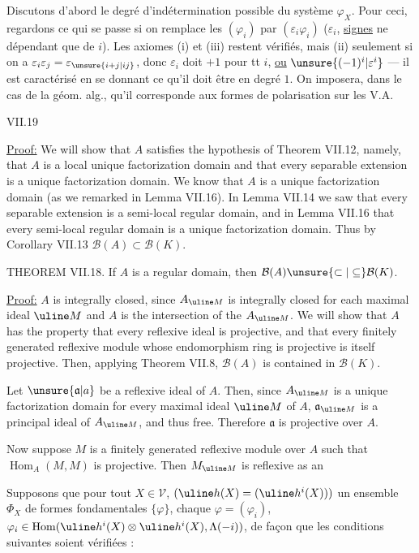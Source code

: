 Discutons d'abord le degré d'indétermination possible du système $\varphi_X$. Pour ceci,   regardons ce qui se passe si on remplace les $(\varphi_i)$ par $(\varepsilon_i\varphi_i)$ ($\varepsilon_i$, \uline{signes} ne dépendant que de $i$). Les axiomes (i) et (iii) restent vérifiés, mais (ii) seulement si on a $\varepsilon_i\varepsilon_j=\varepsilon_{\unsure{i+j|ij}}$, donc $\varepsilon_i$ doit  $+1$ pour tt $i$, \uline{ou} $\unsure{(-1)^i|\varepsilon^i}$ --- il est caractérisé en se donnant ce qu'il doit être en degré $1$.
On imposera, dans le cas de la géom. alg., qu'il corresponde aux formes de polarisation sur les V.A.


VII.19

\uline{Proof:} We will show that $A$ satisfies the hypothesis of
Theorem VII.12, namely, that $A$ is a local unique factorization
domain and that every separable extension is a unique factorization
domain. We know that $A$ is a unique factorization domain (as we
remarked in Lemma VII.16). In Lemma VII.14 we saw that every
separable extension is a semi-local regular domain, and in Lemma
VII.16 that every semi-local regular domain is a unique factorization
domain. Thus by Corollary VII.13 $\mathcal B(A)\subset\mathcal B(K)$.

THEOREM VII.18. If $A$ is a regular domain, then
$\mathcal B(A)\unsure{\subset|\subseteq}\mathcal B(K)$.

\uline{Proof:} $A$ is integrally closed, since $A_{\uline M}$ is integrally closed
for each maximal ideal $\uline M$ and $A$ is the intersection of the $A_{\uline M}$.
We will show that $A$ has the property that every reflexive ideal is
projective, and that every finitely generated reflexive module whose
endomorphism ring is projective is itself projective. Then, applying
Theorem VII.8, $\mathcal B(A)$ is contained in $\mathcal B(K)$.

Let $\unsure{\mathfrak a|a}$ be a reflexive ideal of $A$. Then, since $A_{\uline M}$ is a unique
factorization domain for every maximal ideal $\uline M$ of $A$, $\mathfrak a_{\uline M}$ is a
principal ideal of $A_{\uline M}$, and thus free. Therefore $\mathfrak a$ is projective
over $A$.

Now suppose $M$ is a finitely generated reflexive module over $A$
such that $\operatorname{Hom}_A(M,M)$ is projective. Then $M_{\uline M}$ is reflexive as an

Supposons que pour tout $X\in\mathcal V$, 
$(\uline h(X)=(\uline h^i(X)))$
un ensemble $\Phi_X$ de formes fondamentales
$\{\varphi\}$, chaque $\varphi=(\varphi_i)$,
$\varphi_i\in\operatorname{Hom}(\uline h^i(X)\otimes\uline h^i(X),
\Lambda(-i))$, de façon que les conditions suivantes
soient vérifiées :

